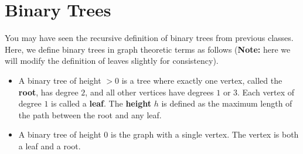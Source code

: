 \documentclass{article}
\begin{document}
\section{Binary Trees}
You may have seen the recursive definition of binary trees from previous classes. Here, we define binary trees in graph theoretic terms as follows (\textbf{Note:} here we will modify the definition of leaves slightly for consistency). 
\begin{itemize}
	\item A binary tree of height $> 0$ is a tree where exactly one vertex, called the \textbf{root}, has degree $2$, and all other vertices have degrees $1$ or $3$. Each vertex of degree $1$ is called a \textbf{leaf}. The \textbf{height} $h$ is defined as the maximum length of the path between the root and any leaf.
	\item A binary tree of height $0$ is the graph with a single vertex. The vertex is both a leaf and a root.
\end{itemize}
\end{document}
